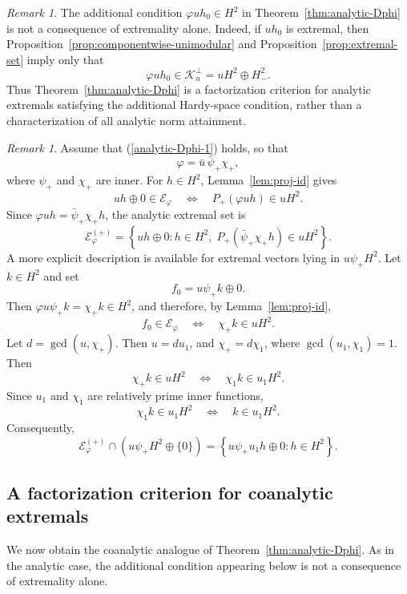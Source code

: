 \documentclass[12pt]{amsart}
\theoremstyle{definition}
\theoremstyle{remark}
\newtheorem{remark}[theorem]{Remark}
\newcommand{\cle}{\mathcal{E}}
\newcommand{\clk}{\mathcal{K}}
\newcommand{\vp}{\varphi}
\numberwithin{equation}{section}
\begin{document}
\begin{remark}
The additional condition $\vp uh_0\in H^2$ in Theorem~\ref{thm:analytic-Dphi} is not a consequence of extremality alone. Indeed, if $uh_0$ is extremal, then	Proposition~\ref{prop:componentwise-unimodular} and Proposition~\ref{prop:extremal-set} imply only that
\[\vp uh_0\in\clk_u^\perp=uH^2\oplus H^2_{-}.
\]
Thus Theorem~\ref{thm:analytic-Dphi} is a factorization criterion for analytic extremals satisfying the additional Hardy-space condition, rather than a characterization of all
analytic norm attainment.
\end{remark}


 \begin{remark}
 Assume that \textup{(\ref{analytic-Dphi-1})} holds, so that
 \[
 \vp=\bar{u}\,\bar\psi_{+}\chi_{+},
 \]
 where $\psi_{+}$ and $\chi_{+}$ are inner. For $h\in H^2$,
 Lemma~\ref{lem:proj-id} gives
\[
uh\oplus0\in\cle_\vp \quad\Longleftrightarrow\quad
 P_{+}(\vp uh)\in uH^2.
\]
Since $\vp uh=\bar\psi_{+}\chi_{+}h$, the analytic extremal set is
\[
 \cle_\vp^{(+)}=\left\{uh\oplus0:h\in H^2,\;
 P_{+}\left(\bar\psi_{+}\chi_{+}h\right)\in uH^2\right\}.
 \]
 A more explicit description is available for extremal vectors lying
 in $u\psi_{+}H^2$. Let $k\in H^2$ and set
 \[
f_0=u\psi_{+}k\oplus0.
\]
Then $ \vp u\psi_{+}k=\chi_{+}k\in H^2$, and therefore, by Lemma~\ref{lem:proj-id},
\[
f_0\in\cle_\vp \quad\Longleftrightarrow\quad\chi_{+}k\in uH^2.
 \]
Let $d=\gcd(u,\chi_{+})$. Then $u=du_1$, and $\chi_{+}=d\chi_1$,
where $\gcd(u_1,\chi_1)=1$. Then
 \[
 \chi_{+}k\in uH^2
 	\quad\Longleftrightarrow\quad
 	\chi_1k\in u_1H^2.
\]
Since $u_1$ and $\chi_1$ are relatively prime inner functions,
\[
\chi_1k\in u_1H^2 \quad\Longleftrightarrow\quad
k\in u_1H^2.
\]
Consequently,
 \[
 \cle_\vp^{(+)}\cap \left(u\psi_{+}H^2\oplus\{0\}\right)
 =\left\{u\psi_{+}u_1h\oplus0:h\in H^2
 \right\}.
 \]
 \end{remark}
 


\subsection{A factorization criterion for coanalytic extremals}

We now obtain the coanalytic analogue of
Theorem~\ref{thm:analytic-Dphi}. As in the analytic case, the
additional condition appearing below is not a consequence of
extremality alone.
\end{document}
